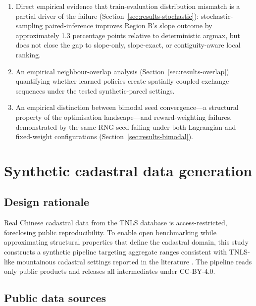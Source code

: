 \documentclass[]{interact}
\theoremstyle{plain}
\begin{document}
\begin{enumerate}
\item Direct empirical evidence that train-evaluation distribution mismatch is a partial driver of the failure (Section~\ref{sec:results-stochastic}): stochastic-sampling paired-inference improves Region B's slope outcome by approximately 1.3 percentage points relative to deterministic argmax, but does not close the gap to slope-only, slope-exact, or contiguity-aware local ranking.

\item An empirical neighbour-overlap analysis (Section~\ref{sec:results-overlap}) quantifying whether learned policies create spatially coupled exchange sequences under the tested synthetic-parcel settings.

\item An empirical distinction between bimodal seed convergence---a structural property of the optimisation landscape---and reward-weighting failures, demonstrated by the same RNG seed failing under both Lagrangian and fixed-weight configurations (Section~\ref{sec:results-bimodal}).
\end{enumerate}

\section{Synthetic cadastral data generation}\label{sec:synth}

\subsection{Design rationale}

Real Chinese cadastral data from the TNLS database is access-restricted, foreclosing public reproducibility. To enable open benchmarking while approximating structural properties that define the cadastral domain, this study constructs a synthetic pipeline targeting aggregate ranges consistent with TNLS-like mountainous cadastral settings reported in the literature \citep{wu2005consolidation,tan2006fragmentation,niu2023ffi}. The pipeline reads only public products and releases all intermediates under CC-BY-4.0.

\subsection{Public data sources}
\end{document}
